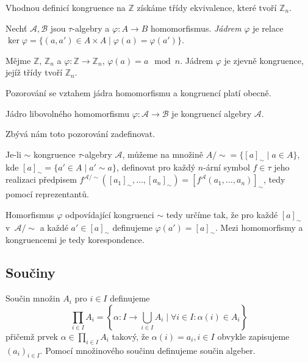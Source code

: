 \begin{definition}
    Vhodnou definicí kongruence na $\mathbb{Z}$ získáme
    třídy ekvivalence, které tvoří $\mathbb{Z}_n$.
\end{definition}

\begin{definition}
    Nechť $\mathcal{A}, \mathcal{B}$ jsou $\tau$-algebry
    a $\varphi : A \to B$ homomorfismus.
    {\em Jádrem} $\varphi$ je relace
    $\ker \varphi  = \{ (a, a') \in A \times A \mid \varphi(a) = \varphi(a') \}$.
\end{definition}

\begin{example}
    Mějme $\mathbb{Z}$, $\mathbb{Z}_n$ a
    $\varphi : \mathbb{Z} \to \mathbb{Z}_n$, $\varphi(a) = a \mod n$.
    Jádrem $\varphi$ je zjevně kongruence, jejíž třídy tvoří
    $\mathbb{Z}_n$.
\end{example}

Pozorování se vztahem jádra homomorfismu a kongruencí platí obecně.

\begin{claim}
    Jádro libovolného homomorfismu
    $\varphi : \mathcal{A} \to \mathcal{B}$
    je kongruencí algebry $\mathcal{A}$.
\end{claim}

Zbývá nám toto pozorování zadefinovat.

\begin{definition}
    Je-li $\sim$ kongruence $\tau$-algebry $\mathcal{A}$, můžeme na
    množině $A/{\sim} = \{ [a]_\sim \mid a \in A \}$,
    kde $[a]_\sim = \{ a' \in A \mid a' \sim a \}$,
    definovat pro každý $n$-ární symbol $f \in \tau$ jeho realizaci
    předpisem
    $f^{\mathcal{A}/{\sim}}([a_1]_\sim,\ldots,[a_n]_\sim)
    = [f^\mathcal{A}(a_1, \ldots, a_n)]_\sim$,
    tedy pomocí reprezentantů.
\end{definition}

Homorfismus $\varphi$ odpovídající kongruenci $\sim$ tedy určíme
tak, že pro každé $[a]_{\sim}$ v~$\mathcal{A}/{\sim}$
a každé $a' \in [a]_{\sim}$ definujeme
$\varphi(a') = [a]_{\sim}$.
Mezi homomorfismy a kongruencemi je tedy korespondence.

\subsection{Součiny}

Součin množin $A_i$ pro $i \in I$ definujeme
\[
    \prod_{i \in I} A_i = \left\{ \alpha : I \to \bigcup_{i \in I} A_i
    \mid \forall i \in I : \alpha(i) \in A_i \right\}
\]
přičemž prvek $\alpha \in \prod_{i \in I} A_i$ takový, že $\alpha(i) =
a_i, i \in I$ obvykle zapisujeme $(a_i)_{i \in I}$.
Pomocí množinového součinu definujeme součin algeber.

